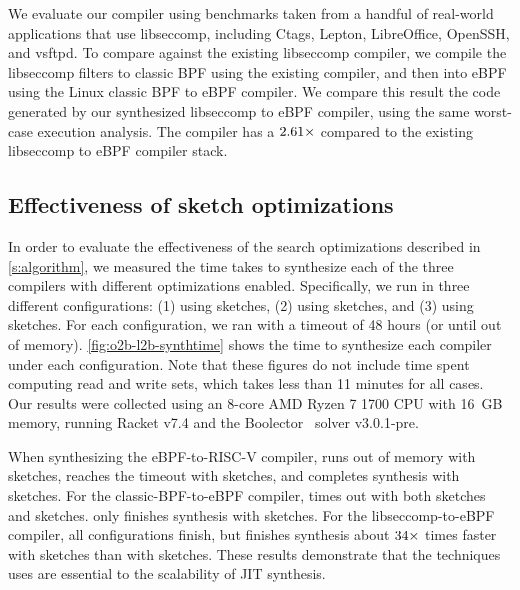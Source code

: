 We evaluate our compiler using benchmarks taken from a handful of real-world applications
that use libseccomp, including Ctags, Lepton, LibreOffice, OpenSSH, and vsftpd.
%
To compare against the existing libseccomp compiler, we compile the libseccomp
filters to classic BPF using the existing compiler, and then into eBPF using
the Linux classic BPF to eBPF compiler.
%
We compare this result the code generated by our synthesized libseccomp to eBPF compiler,
using the same worst-case execution analysis.
%
The \jitsynth compiler has a $2.61\times$ compared to the
existing libseccomp to eBPF compiler stack.
%
%
\fi
\fi

\subsection{Effectiveness of sketch optimizations}

In order to evaluate the effectiveness of the search optimizations
described in \autoref{s:algorithm}, we measured the time \jitsynth
takes to synthesize each of the three compilers with different optimizations
enabled.
%
Specifically, we run \jitsynth in three different configurations:
(1) using \Naive sketches, (2) using \RW sketches, and (3) using \LCS sketches.
%
For each configuration, we ran \jitsynth with a timeout of 48 hours (or until out of memory).
\autoref{fig:o2b-l2b-synthtime} shows the time to synthesize
each compiler under each configuration.
%
Note that these figures do not include time spent computing read and write sets,
which takes less than 11 minutes for all cases.
%
Our results were collected using an 8-core AMD Ryzen 7 1700 CPU with 16~GB memory,
running Racket v7.4 and the Boolector~\cite{niemetz:boolector} solver v3.0.1-pre.


When synthesizing the eBPF-to-RISC-V compiler,
\jitsynth runs out of memory with \Naive sketches,
reaches the timeout with \RW sketches,
and completes synthesis with \LCS sketches.
%
For the classic-BPF-to-eBPF compiler,
\jitsynth times out with both \Naive sketches and \RW sketches.
\jitsynth only finishes synthesis with \LCS sketches.
%
For the libseccomp-to-eBPF compiler, all configurations finish,
but \jitsynth finishes synthesis about $34\times$ times faster
with \LCS sketches than with \Naive sketches.
%
These results demonstrate that the techniques \jitsynth uses
are essential to the scalability of JIT synthesis.

